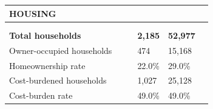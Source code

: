 \documentclass[9pt]{report}
\begin{document}
\vspace{12pt}
\setlength{\tabcolsep}{.01in} %
\begin{tabular}{p{.10in}p{.10in}p{.10in}p{3.7in}>{\hfill}p{.85in}>{\hfill}p{.85in}>{\hfill}p{.85in}>{\hfill}p{.85in}p{0.1in}}
\multicolumn{9}{l}{\parbox{7.1in}{\raggedright{\large{\strut\textbf{HOUSING}\strut}}}} \\ 
\hline
\multicolumn{4}{l}{\parbox{3.5in}{\raggedright{\textbf{}}}} & \multicolumn{1}{r}{\parbox{.85in}{\strut\raggedleft{\textbf{}\strut}}} & \multicolumn{1}{r}{\parbox{.85in}{\strut\raggedleft{\textbf{}\strut}}} & \multicolumn{1}{r}{\parbox{.85in}{\strut{}}} & \multicolumn{1}{r}{\parbox{.85in}{\strut{}}} & \\ 
\multicolumn{9}{l}{} \\ 
\multicolumn{4}{l}{\parbox{3.5in}{\strut\raggedright{\textbf{Total households}\strut}}} & \textbf{} & \textbf{} & \textbf{2,185} & \textbf{52,977} & \textbf{} \\ 
\multicolumn{4}{l}{\parbox{3.6in}{\strut\raggedright{{Owner-occupied households}}\strut}} &  &  & 474 & 15,168 & \multicolumn{1}{l}{}  \\ 
\multicolumn{4}{l}{\parbox{3.6in}{\strut\raggedright{{Homeownership rate}}\strut}} &  &  & 22.0\% & 29.0\% & \multicolumn{1}{l}{}  \\ 
\multicolumn{4}{l}{\parbox{3.6in}{\strut\raggedright{{Cost-burdened households}}\strut}} &  &  & 1,027 & 25,128 & \multicolumn{1}{l}{}  \\ 
\multicolumn{4}{l}{\parbox{3.6in}{\strut\raggedright{{Cost-burden rate}}\strut}} &  &  & 49.0\% & 49.0\% & \multicolumn{1}{l}{}  \\ 

\end{tabular}
\setlength{\tabcolsep}{6pt} %
\end{document}
